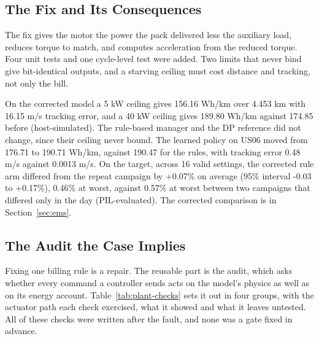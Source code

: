 \documentclass{ieeeaccess}
\begin{document}
\subsection{The Fix and Its Consequences}

The fix gives the motor the power the pack delivered less the auxiliary load, reduces torque to match, and computes acceleration from the reduced torque. Four unit tests and one cycle-level test were added. Two limits that never bind give bit-identical outputs, and a starving ceiling must cost distance and tracking, not only the bill.

On the corrected model a 5 kW ceiling gives 156.16 Wh/km over 4.453 km with 16.15 m/s tracking error, and a 40 kW ceiling gives 189.80 Wh/km against 174.85 before (host-simulated). The rule-based manager and the DP reference did not change, since their ceiling never bound. The learned policy on US06 moved from 176.71 to 190.71 Wh/km, against 190.47 for the rules, with tracking error 0.48 m/s against 0.0013 m/s. On the target, across 16 valid settings, the corrected rule arm differed from the repeat campaign by +0.07\% on average (95\% interval -0.03 to +0.17\%), 0.46\% at worst, against 0.57\% at worst between two campaigns that differed only in the day (PIL-evaluated). The corrected comparison is in Section~\ref{sec:ems}.

\subsection{The Audit the Case Implies}
\label{sec:checks}

Fixing one billing rule is a repair. The reusable part is the audit, which asks whether every command a controller sends acts on the model's physics as well as on its energy account. Table~\ref{tab:plant-checks} sets it out in four groups, with the actuator path each check exercised, what it showed and what it leaves untested. All of these checks were written after the fault, and none was a gate fixed in advance.
\end{document}
